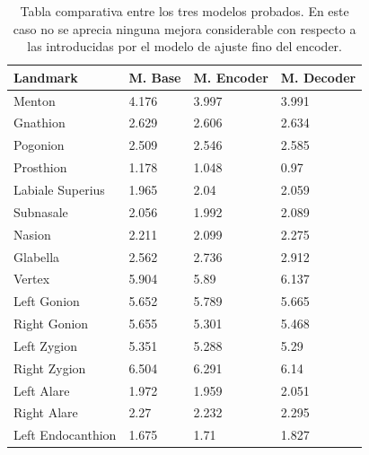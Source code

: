         \begin{table}[!ht]
            \centering
            \caption{Tabla comparativa entre los tres modelos probados. En este caso no se aprecia ninguna mejora considerable con respecto a las introducidas por el modelo de ajuste fino del encoder.}
            \begin{tabular}{|l|l|l|l|}
            \hline
                \cellcolor{gray!25}\textbf{Landmark} & \cellcolor{gray!25}\textbf{M. Base} & \cellcolor{gray!25}\textbf{M. Encoder} & \cellcolor{gray!25}\textbf{M. Decoder} \\ \hline
                Menton & 4.176 & 3.997 & \cellcolor{green!25}3.991 \\ \hline
                Gnathion & 2.629 &  \cellcolor{green!25}2.606 & 2.634 \\ \hline
                Pogonion &  \cellcolor{green!25}2.509 & 2.546 & 2.585 \\ \hline
                Prosthion & 1.178 &  \cellcolor{green!25}1.048 & 0.97 \\ \hline
                Labiale Superius &  \cellcolor{green!25}1.965 & 2.04 & 2.059 \\ \hline
                Subnasale & 2.056 &  \cellcolor{green!25}1.992 & 2.089 \\ \hline
                Nasion & 2.211 &  \cellcolor{green!25}2.099 & 2.275 \\ \hline
                Glabella & 2.562 &  \cellcolor{green!25}2.736 & 2.912 \\ \hline
                \cellcolor{yellow!50}Vertex &\cellcolor{yellow!50} 5.904 &  \cellcolor{yellow!50}5.89 & \cellcolor{yellow!50}6.137 \\ \hline
                Left Gonion & \cellcolor{green!25}5.652 & 5.789 & 5.665 \\ \hline
                Right Gonion & 5.655 & \cellcolor{green!25}5.301 & 5.468 \\ \hline
                Left Zygion & 5.351 & \cellcolor{green!25}5.288 & 5.29 \\ \hline
                Right Zygion & 6.504 & 6.291 & \cellcolor{green!25}6.14 \\ \hline
                Left Alare & 1.972 & \cellcolor{green!25}1.959 & 2.051 \\ \hline
                Right Alare & 2.27 & \cellcolor{green!25}2.232 & 2.295 \\ \hline
                Left Endocanthion & \cellcolor{green!25}1.675 & 1.71 & 1.827 \\ \hline

\end{tabular}
\end{table}
